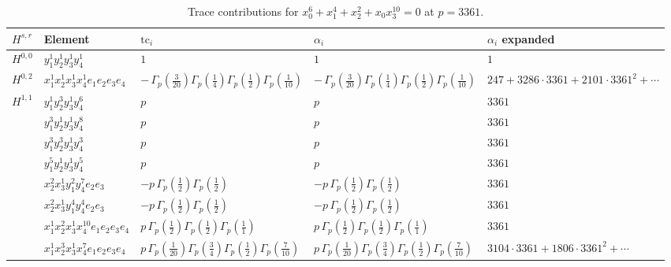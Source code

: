 \documentclass[11pt]{article}
\begin{document}
\begin{table}[ht]
\centering
\caption{Trace contributions for $x_0^{6} + x_1^{4} + x_2^{2} + x_0 x_3^{10} = 0$ at $p=3361$.}\label{tab:deformed-23}
\renewcommand{\arraystretch}{1.1}
{\scriptsize
\begin{tabular}{@{}lllll@{}}
\toprule
$H^{s,r}$ & Element & $\mathrm{tc}_i$ & $\alpha_i$ & $\alpha_i$ expanded \\
\midrule
$H^{0,0}$ & $y_{1}^{1} y_{2}^{1} y_{3}^{1} y_{4}^{1}$ & $1$ & $1$ & $1$ \\
\midrule
$H^{0,2}$ & $x_{1}^{1} x_{2}^{1} x_{3}^{1} x_{4}^{1}  e_{1} e_{2} e_{3} e_{4}$ & $- \, \Gamma_p \left( \frac{3}{20} \right) \Gamma_p \left( \frac{1}{4} \right) \Gamma_p \left( \frac{1}{2} \right) \Gamma_p \left( \frac{1}{10} \right)$ & $- \, \Gamma_p \left( \frac{3}{20} \right) \Gamma_p \left( \frac{1}{4} \right) \Gamma_p \left( \frac{1}{2} \right) \Gamma_p \left( \frac{1}{10} \right)$ & $247{+}3286{\cdot}3361{+}2101{\cdot}3361^{2}{+}\cdots$ \\
\midrule
$H^{1,1}$ & $y_{1}^{1} y_{2}^{3} y_{3}^{1} y_{4}^{6}$ & $p \,$ & $p \,$ & $3361$ \\
 & $y_{1}^{3} y_{2}^{1} y_{3}^{1} y_{4}^{8}$ & $p \,$ & $p \,$ & $3361$ \\
 & $y_{1}^{3} y_{2}^{3} y_{3}^{1} y_{4}^{3}$ & $p \,$ & $p \,$ & $3361$ \\
 & $y_{1}^{5} y_{2}^{1} y_{3}^{1} y_{4}^{5}$ & $p \,$ & $p \,$ & $3361$ \\
 & $x_{2}^{2} x_{3}^{1} y_{1}^{2} y_{4}^{7} e_{2} e_{3}$ & $- p \, \Gamma_p \left( \frac{1}{2} \right) \Gamma_p \left( \frac{1}{2} \right)$ & $- p \, \Gamma_p \left( \frac{1}{2} \right) \Gamma_p \left( \frac{1}{2} \right)$ & $3361$ \\
 & $x_{2}^{2} x_{3}^{1} y_{1}^{4} y_{4}^{4} e_{2} e_{3}$ & $- p \, \Gamma_p \left( \frac{1}{2} \right) \Gamma_p \left( \frac{1}{2} \right)$ & $- p \, \Gamma_p \left( \frac{1}{2} \right) \Gamma_p \left( \frac{1}{2} \right)$ & $3361$ \\
 & $x_{1}^{1} x_{2}^{2} x_{3}^{1} x_{4}^{10}  e_{1} e_{2} e_{3} e_{4}$ & $p \, \Gamma_p \left( \frac{1}{2} \right) \Gamma_p \left( \frac{1}{2} \right) \Gamma_p \left( \frac{1}{1} \right)$ & $p \, \Gamma_p \left( \frac{1}{2} \right) \Gamma_p \left( \frac{1}{2} \right) \Gamma_p \left( \frac{1}{1} \right)$ & $3361$ \\
 & $x_{1}^{1} x_{2}^{3} x_{3}^{1} x_{4}^{7}  e_{1} e_{2} e_{3} e_{4}$ & $p \, \Gamma_p \left( \frac{1}{20} \right) \Gamma_p \left( \frac{3}{4} \right) \Gamma_p \left( \frac{1}{2} \right) \Gamma_p \left( \frac{7}{10} \right)$ & $p \, \Gamma_p \left( \frac{1}{20} \right) \Gamma_p \left( \frac{3}{4} \right) \Gamma_p \left( \frac{1}{2} \right) \Gamma_p \left( \frac{7}{10} \right)$ & $3104{\cdot}3361{+}1806{\cdot}3361^{2}{+}\cdots$ \\

\end{tabular}}
\end{table}
\end{document}
